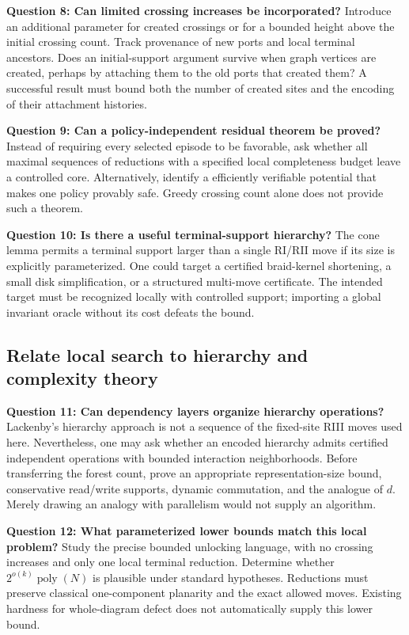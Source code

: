 \documentclass[11pt]{article}
\theoremstyle{definition}
\newcommand{\poly}{\operatorname{poly}}
\begin{document}
\textbf{Question 8: Can limited crossing increases be incorporated?}
Introduce an additional parameter for created crossings or for a bounded
height above the initial crossing count. Track provenance of new ports
and local terminal ancestors. Does an initial-support argument survive
when graph vertices are created, perhaps by attaching them to the old
ports that created them? A successful result must bound both the number
of created sites and the encoding of their attachment histories.

\textbf{Question 9: Can a policy-independent residual theorem be proved?}
Instead of requiring every selected episode to be favorable, ask whether
all maximal sequences of reductions with a specified local completeness
budget leave a controlled core. Alternatively, identify a efficiently
verifiable potential that makes one policy provably safe. Greedy
crossing count alone does not provide such a theorem.

\textbf{Question 10: Is there a useful terminal-support hierarchy?}
The cone lemma permits a terminal support larger than a single RI/RII
move if its size is explicitly parameterized. One could target a
certified braid-kernel shortening, a small disk simplification, or a
structured multi-move certificate. The intended target must be recognized
locally with controlled support; importing a global invariant oracle
without its cost defeats the bound.

\subsection{Relate local search to hierarchy and complexity theory}

\textbf{Question 11: Can dependency layers organize hierarchy
operations?} Lackenby's hierarchy approach is not a sequence of the
fixed-site RIII moves used here. Nevertheless, one may ask whether an
encoded hierarchy admits certified independent operations with bounded
interaction neighborhoods. Before transferring the forest count, prove
an appropriate representation-size bound, conservative read/write
supports, dynamic commutation, and the analogue of $d$. Merely drawing
an analogy with parallelism would not supply an algorithm.

\textbf{Question 12: What parameterized lower bounds match this local
problem?} Study the precise bounded unlocking language, with no crossing
increases and only one local terminal reduction. Determine whether
$2^{o(k)}\poly(N)$ is plausible under standard hypotheses. Reductions
must preserve classical one-component planarity and the exact allowed
moves. Existing hardness for whole-diagram defect does not automatically
supply this lower bound.
\end{document}
